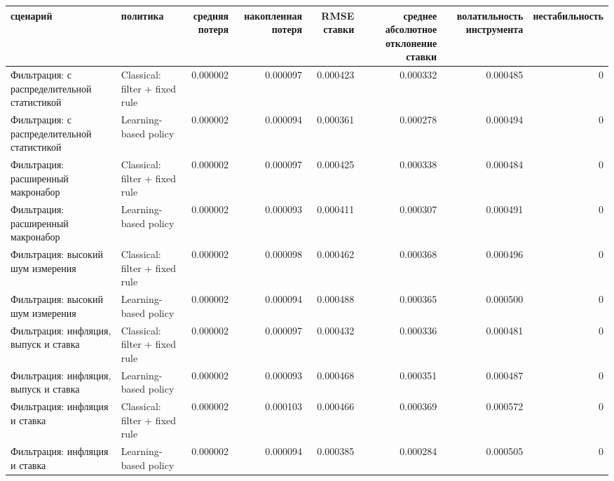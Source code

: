 \begin{tabular}{llrrrrrr}
\toprule
сценарий & политика & средняя потеря & накопленная потеря & RMSE ставки & среднее абсолютное отклонение ставки & волатильность инструмента & нестабильность \\
\midrule
Фильтрация: с распределительной статистикой & Classical: filter + fixed rule & 0.000002 & 0.000097 & 0.000423 & 0.000332 & 0.000485 & 0 \\
Фильтрация: с распределительной статистикой & Learning-based policy & 0.000002 & 0.000094 & 0.000361 & 0.000278 & 0.000494 & 0 \\
Фильтрация: расширенный макронабор & Classical: filter + fixed rule & 0.000002 & 0.000097 & 0.000425 & 0.000338 & 0.000484 & 0 \\
Фильтрация: расширенный макронабор & Learning-based policy & 0.000002 & 0.000093 & 0.000411 & 0.000307 & 0.000491 & 0 \\
Фильтрация: высокий шум измерения & Classical: filter + fixed rule & 0.000002 & 0.000098 & 0.000462 & 0.000368 & 0.000496 & 0 \\
Фильтрация: высокий шум измерения & Learning-based policy & 0.000002 & 0.000094 & 0.000488 & 0.000365 & 0.000500 & 0 \\
Фильтрация: инфляция, выпуск и ставка & Classical: filter + fixed rule & 0.000002 & 0.000097 & 0.000432 & 0.000336 & 0.000481 & 0 \\
Фильтрация: инфляция, выпуск и ставка & Learning-based policy & 0.000002 & 0.000093 & 0.000468 & 0.000351 & 0.000487 & 0 \\
Фильтрация: инфляция и ставка & Classical: filter + fixed rule & 0.000002 & 0.000103 & 0.000466 & 0.000369 & 0.000572 & 0 \\
Фильтрация: инфляция и ставка & Learning-based policy & 0.000002 & 0.000094 & 0.000385 & 0.000284 & 0.000505 & 0 \\
\bottomrule
\end{tabular}
